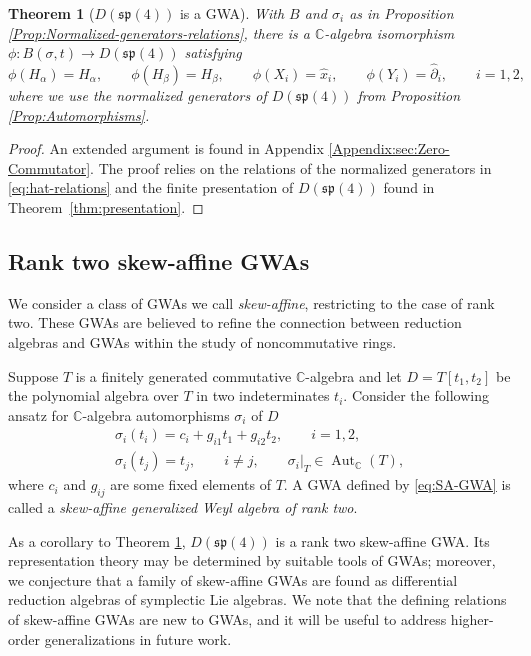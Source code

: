 \documentclass[pdftex]{sigma}
\numberwithin{equation}{section}
\newtheorem{Theorem}{Theorem}[section]
\DeclareMathOperator{\Aut}{Aut}
\begin{document}
\begin{Theorem}[$D(\mathfrak{sp}(4))$ is a GWA]\label{thm:GWA-realization}
	With $B$ and $\sigma_{i}$ as in Proposition {\rm\ref{Prop:Normalized-generators-relations}}, there is a $\mathbb{C}$-algebra isomorphism
$\phi\colon B(\sigma,t) \longrightarrow D(\mathfrak{sp}(4))
$
	satisfying
	\[\phi(H_\alpha)=H_\alpha,\qquad
	\phi(H_\beta)=H_\beta,\qquad
	\phi(X_i)=\hat x_i,\qquad
	\phi(Y_i)=\hat \partial_i,\qquad i=1,2,
	\]
	where we use the normalized generators of $D(\mathfrak{sp}(4))$ from Proposition {\rm\ref{Prop:Automorphisms}}.
\end{Theorem}
\begin{proof}
	An extended argument is found in Appendix \ref{Appendix:sec:Zero-Commutator}. The proof relies on the relations of the normalized generators in \eqref{eq:hat-relations} and the finite presentation of $D(\mathfrak{sp}(4))$ found in Theorem~\ref{thm:presentation}.
\end{proof}

\subsection{Rank two skew-affine GWAs}\label{subsec:GWA-skew-affine}
We consider a class of GWAs we call \emph{skew-affine}, restricting to the case of rank two. These GWAs are believed to refine the connection \cite{vandenhomberghNoteMickelssonStep1975} between reduction algebras and GWAs within the study of noncommutative rings.

\begin{Definition}\label{def:SA-GWArank2}
	Suppose $T$ is a finitely generated commutative $\mathbb{C}$-algebra and let $D=T[t_1,t_2]$ be the polynomial algebra over $T$ in two indeterminates $t_i$. Consider the following ansatz for $\mathbb{C}$-algebra automorphisms $\sigma_i$ of $D$
	\begin{gather}\label{eq:SA-GWA}
		\sigma_i(t_i)=c_i+g_{i1}t_1+g_{i2}t_2,\qquad i=1,2,\\
		\sigma_i(t_j)=t_j,\qquad i\neq j,\qquad
		\sigma_i|_T\in\Aut_\mathbb{C}(T),\nonumber
	\end{gather}
	where $c_i$ and $g_{ij}$ are some fixed elements of $T$. A GWA defined by \eqref{eq:SA-GWA} is called a \emph{skew-affine generalized Weyl algebra of rank two}.
\end{Definition}


As a corollary to Theorem \ref{thm:GWA-realization}, $D(\mathfrak{sp}(4))$ is a rank two skew-affine GWA. Its representation theory may be determined by suitable tools of GWAs; moreover, we conjecture that a family of skew-affine GWAs are found as differential reduction algebras of symplectic Lie algebras. We note that the defining relations of skew-affine GWAs are new to GWAs, and it will be useful to address higher-order generalizations in future work.
\end{document}
